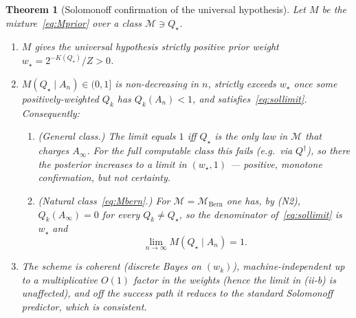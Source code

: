 \documentclass{amsart}
\newtheorem{theorem}{Theorem}
\theoremstyle{definition}
\begin{document}
\begin{theorem}[Solomonoff confirmation of the universal hypothesis]\label{thm:sol}
Let $M$ be the mixture~\eqref{eq:Mprior} over a class $\mathcal M\ni Q_\star$.
\begin{enumerate}
\item[\textup{(i)}] $M$ gives the universal hypothesis strictly positive prior
weight $w_\star=2^{-K(Q_\star)}/Z>0$.
\item[\textup{(ii)}] $M(Q_\star\mid A_n)\in(0,1]$ is non-decreasing in $n$,
strictly exceeds $w_\star$ once some positively-weighted $Q_k$ has $Q_k(A_n)<1$,
and satisfies~\eqref{eq:sollimit}. Consequently:
\begin{enumerate}
\item[\textup{(ii-a)}] \emph{(General class.)} The limit equals $1$ \emph{iff}
$Q_\star$ is the only law in $\mathcal M$ that charges $A_\infty$. For the
\emph{full} computable class this fails (e.g.\ via $Q^{\dagger}$), so there the
posterior increases to a limit in $(w_\star,1)$ --- positive, monotone
confirmation, but not certainty.
\item[\textup{(ii-b)}] \emph{(Natural class~\eqref{eq:Mbern}.)} For
$\mathcal M=\mathcal M_{\mathrm{Bern}}$ one has, by (N2), $Q_k(A_\infty)=0$ for
every $Q_k\ne Q_\star$, so the denominator of~\eqref{eq:sollimit} is $w_\star$ and
\[
  \lim_{n\to\infty}M(Q_\star\mid A_n)=1.
\]
\end{enumerate}
\item[\textup{(iii)}] The scheme is coherent (discrete Bayes on $(w_k)$),
machine-independent up to a multiplicative $O(1)$ factor in the weights (hence the
limit in (ii-b) is unaffected), and off the success path it reduces to the
standard Solomonoff predictor, which is consistent.
\end{enumerate}
\end{theorem}
\end{document}
